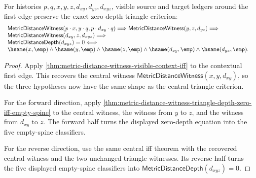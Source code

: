 \begin{theorem}
\label{thm:metric-distance-witness-visible-context-triangle-depth-zero-iff-empty-spine}
For histories $p,q,x,y,z,d_{xy},d_{yz},d_{xyz}$, visible source and target
ledgers around the first edge preserve the exact zero-depth triangle criterion:
$$
\begin{array}{l}
\mathsf{MetricDistanceWitness}(p\cdot x,y\cdot q,p\cdot d_{xy}\cdot q)
\Longrightarrow
\mathsf{MetricDistanceWitness}(y,z,d_{yz})\Longrightarrow
\\
\mathsf{MetricDistanceWitness}(d_{xy},z,d_{xyz})\Longrightarrow
\\
\mathsf{MetricDistanceDepth}(d_{xyz})=0
\Longleftrightarrow
\\
\hsame(x,\emp)\land\hsame(y,\emp)\land\hsame(z,\emp)\land
\hsame(d_{xy},\emp)\land\hsame(d_{yz},\emp).
\end{array}
$$
\end{theorem}
\begin{proof}
Apply \autoref{thm:metric-distance-witness-visible-context-iff} to the
contextual first edge. This recovers the central witness
$\mathsf{MetricDistanceWitness}(x,y,d_{xy})$, so the three hypotheses now have
the same shape as the central triangle criterion.

For the forward direction, apply
\autoref{thm:metric-distance-witness-triangle-depth-zero-iff-empty-spine} to the
central witness, the witness from $y$ to $z$, and the witness from $d_{xy}$ to
$z$. The forward half turns the displayed zero-depth equation into the five
empty-spine classifiers.

For the reverse direction, use the same central iff theorem with the recovered
central witness and the two unchanged triangle witnesses. Its reverse half turns
the five displayed empty-spine classifiers into
$\mathsf{MetricDistanceDepth}(d_{xyz})=0$.
\end{proof}


